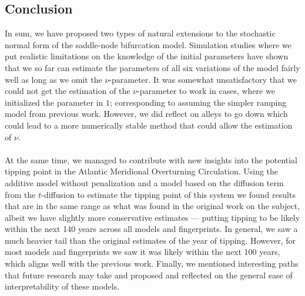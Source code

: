 \subsection{Conclusion}
In sum, we have proposed two types of natural extensions to the stochastic normal form of the saddle-node bifurcation model. Simulation studies where we put realistic limitations on the knowledge of the initial parameters have shown that we so far can estimate the parameters of all six variations of the model fairly well as long as we omit the $\nu$-parameter. It was somewhat unsatisfactory that we could not get the estimation of the $\nu$-parameter to work in cases, where we initialized the parameter in $1$; corresponding to assuming the simpler ramping model from previous work. However, we did reflect on alleys to go down which could lead to a more numerically stable method that could allow the estimation of $\nu$.\\\\
At the same time, we managed to contribute with new insights into the potential tipping point in the Atlantic Meridional Overturning Circulation. Using the additive model without penalization and a model based on the diffusion term from the $t$-diffusion to estimate the tipping point of this system we found results that are in the same range as what was found in the original work on the subject, albeit we have slightly more conservative estimates — putting tipping to be likely within the next 140 years across all models and fingerprints. In general, we saw a much heavier tail than the original estimates of the year of tipping. However, for most models and fingerprints we saw it was likely within the next 100 years, which aligns well with the previous work. Finally, we mentioned interesting paths that future research may take and proposed and reflected on the general ease of interpretability of these models. 